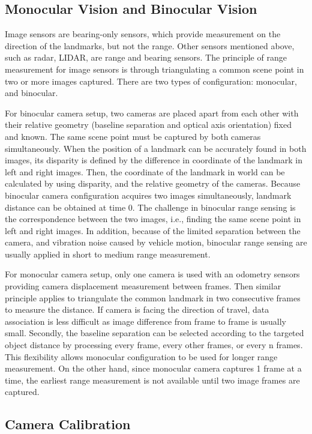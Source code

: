 \subsection{Monocular Vision and Binocular Vision}
Image sensors are bearing-only sensors, which provide measurement on
the direction of the landmarks, but not the range. Other sensors
mentioned above, such as radar, LIDAR, are range and bearing sensors.
The principle of range measurement for image sensors is through
triangulating a common scene point in two or more images captured.
There are two types of configuration: monocular, and binocular.

For binocular camera setup, two cameras are placed apart from each
other with their relative geometry (baseline separation and optical
axis orientation) fixed and known. The same scene point must be
captured by both cameras simultaneously. When the position of a
landmark can be accurately found in both images, its disparity is
defined by the difference in coordinate of the landmark in left and
right images. Then, the coordinate of the landmark in world can be
calculated by using disparity, and the relative geometry of the
cameras. Because binocular camera configuration acquires two images
simultaneously, landmark distance can be obtained at time $0$. The
challenge in binocular range sensing is the correspondence between the
two images, i.e., finding the same scene point in left and right
images. In addition, because of the limited separation between the
camera, and vibration noise caused by vehicle motion, binocular range
sensing are usually applied in short to medium range measurement.

For monocular camera setup, only one camera is used with an odometry
sensors providing camera displacement measurement between frames. Then
similar principle applies to triangulate the common landmark in two
consecutive frames to measure the distance. If camera is facing the
direction of travel, data association is less difficult as image
difference from frame to frame is usually small. Secondly, the
baseline separation can be selected according to the targeted object
distance by processing every frame, every other frames, or every n
frames. This flexibility allows monocular configuration to be
used for longer range measurement. On the other hand, since monocular
camera captures 1 frame at a time, the earliest range measurement is
not available until two image frames are captured.

\subsection{Camera Calibration}

